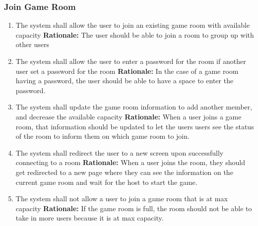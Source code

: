 \documentclass[12pt]{article}
\begin{document}
\subsubsection{Join Game Room}
\begin{enumerate}[label=JG\arabic*., series=JoinGame]
	\item The system shall allow the user to join an existing game room with available capacity \newline 
    \textbf{Rationale:} The user should be able to join a room to group up with other users 
    \item The system shall allow the user to enter a password for the room if another user set a password for the room \newline 
    \textbf{Rationale:} In the case of a game room having a password, the user should be able to have a space to enter the password.
    \item The system shall update the game room information to add another member, and decrease the available capacity\newline 
    \textbf{Rationale:} When a user joins a game room, that information should be updated to let the users users see the status of the room to inform them on which game room to join.
    \item The system shall redirect the user to a new screen upon successfully connecting to a room\newline 
    \textbf{Rationale:} When a user joins the room, they should get redirected to a new page where they can see the information on the current game room and wait for the host to start the game.
    \item The system shall not allow a user to join a game room that is at max capacity\newline
    \textbf{Rationale:} If the game room is full, the room should not be able to take in more users because it is at max capacity.
\end{enumerate}
\end{document}
